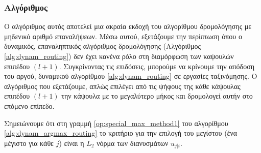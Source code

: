 
\subsubsection{Αλγόριθμος }
Ο αλγόριθμος αυτός αποτελεί μια ακραία εκδοχή του αλγορίθμου δρομολόγησης με μηδενικό αριθμό επαναλήψεων. Μέσω αυτού, εξετάζουμε την περίπτωση όπου ο δυναμικός, επαναληπτικός αλγόριθμος δρομολόγησης (Αλγόριθμος \ref{alg:dynam_routing}) δεν έχει κανένα ρόλο στη διαμόρφωση των καψουλών επιπέδου $(l+1)$. Συγκρίνοντας τις επιδόσεις, μπορούμε να κρίνουμε την απόδοση του αργού, δυναμικού αλγορίθμου \ref{alg:dynam_routing} σε εργασίες ταξινόμησης. Ο αλγόριθμος που εξετάζουμε, απλώς επιλέγει από τις ψήφους της κάθε κάψουλας επιπέδου $(l+1)$ την κάψουλα με το μεγαλύτερο μήκος και δρομολογεί αυτήν στο επόμενο επίπεδο.

Σημειώνουμε ότι στη γραμμή \ref{op:special_max_method1} του αλγορίθμου \ref{alg:dynam_argmax_routing} το κριτήριο για την επιλογή του μεγίστου (ένα μέγιστο για κάθε $j$) είναι η $L_2$ νόρμα των διανυσμάτων $\hat{u}_{j|i}$.

